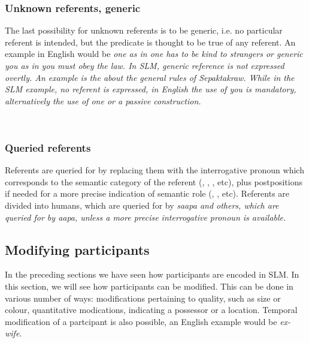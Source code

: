 \subsubsection{Unknown referents, generic}\label{sec:func:Unknownreferents,generic}
The last possibility for unknown referents is to be generic, i.e. no particular referent is intended, but the predicate is thought to be true of any referent. An example in English would be \em one \em as in \em one has to be kind to strangers \em or generic \em you \em as in \em you must obey the law\em. In SLM, generic reference is not expressed overtly. An example is the  about the general rules of Sepaktakraw. While in the SLM example, no referent is expressed, in English the use of \em you \em is mandatory, alternatively the use of \em one \em or a passive construction.


 \\
\subsubsection{Queried referents}\label{sec:func:Queriedreferents}
Referents are queried for by replacing them with the interrogative pronoun    which corresponds to the semantic category of the referent (, , , etc), plus postpositions if needed for a more precise indication of semantic role (, , etc). Referents are divided into humans, which are queried for by \em saapa \em and others, which are queried for by \em aapa\em, unless a more precise interrogative pronoun is available.

\subsection{Modifying participants}\label{sec:func:Modifyingparticipants}
In the preceding sections we have seen how participants are encoded in SLM. In this section, we will see how participants can be modified. This can be done in various number of ways: modifications pertaining to quality, such as size or colour, quantitative modications, indicating a possessor or a location. Temporal modification of a partcipant is also possible, an English example would be \em ex-wife\em.

